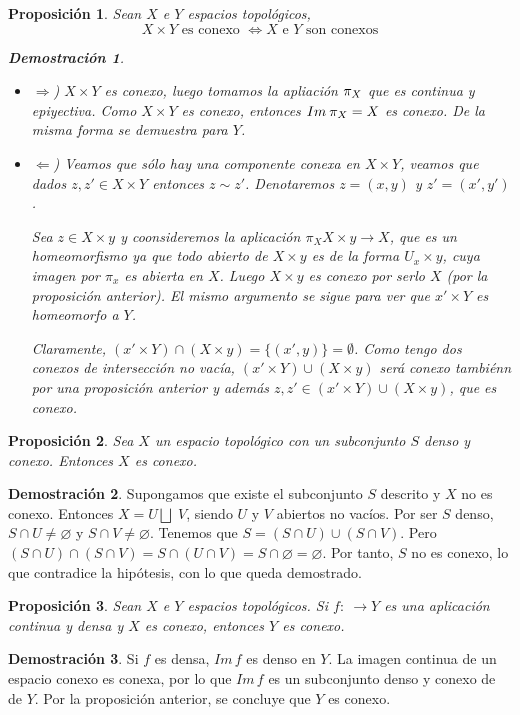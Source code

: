 \documentclass[12pt,twoside]{report}
\theoremstyle{azul}
\theoremstyle{azul2}
\theoremstyle{plain}
\newtheorem*{prop}{Proposición}
\theoremstyle{definition}
\newtheorem*{dem}{Demostración}
\theoremstyle{remark}
\begin{document}
\begin{prop}
Sean $X$ e $Y$ espacios topológicos, 
$$X \times Y \text{ es conexo } \iff X \text{ e } Y \text{ son conexos}$$
\begin{dem}\:\vspace{-5mm}
\begin{itemize}
    \item $\Rightarrow$) $X \times Y$ es conexo, luego tomamos la apliación $\mathlarger{\pi}_X$ que es continua y epiyectiva. Como $X \times Y$ es conexo, entonces $Im \: \mathlarger{\pi_X}=X$ es conexo. De la misma forma se demuestra para $Y$.

\item $\Leftarrow$) Veamos que sólo hay una componente conexa en $X \times Y$, veamos que dados $z,z'\in X \times Y$ entonces $z \sim z'$. Denotaremos $z=(x,y)$ y $z'=(x',y')$. 

Sea $z\in X \times y$ y coonsideremos la aplicación $\pi_X X \times y \longrightarrow X$, que es un homeomorfismo ya que todo abierto de $X\times y$ es de la forma $U_x\times y$, cuya imagen por $\pi_x$ es abierta en $X$. Luego $X \times y$ es conexo por serlo $X$ (por la proposición anterior). El mismo argumento se sigue para ver que $x' \times Y$ es homeomorfo a $Y$.

Claramente, $(x' \times Y) \cap (X \times y)=\{(x',y)\}=\emptyset$. Como tengo dos conexos de intersección no vacía, $(x'\times Y) \cup (X \times y)$ será conexo tambiénn por una proposición anterior y además $z,z' \in (x'\times Y) \cup (X \times y)$, que es conexo.

\end{itemize}
\end{dem}
\end{prop}
\begin{prop}
Sea $X$ un espacio topológico con un subconjunto $S$ denso y conexo. Entonces $X$ es conexo.
\end{prop}
\begin{dem}
Supongamos que existe el subconjunto $S$ descrito y $X$ no es conexo. Entonces $X = U \bigsqcup \; V$, siendo $U$ y $V$ abiertos no vacíos. Por ser $S$ denso, $S \cap U \neq \varnothing$ y $S \cap V \neq \varnothing$. Tenemos que $S = (S \cap U) \cup (S \cap V)$. Pero $(S \cap U) \cap (S \cap V) = S \cap (U \cap V) = S \cap \varnothing = \varnothing$. Por tanto, $S$ no es conexo, lo que contradice la hipótesis, con lo que queda demostrado.
\end{dem}

\begin{prop}
Sean $X$ e $Y$ espacios topológicos. Si $f:\ \longrightarrow Y$ es una aplicación continua y densa y $X$ es conexo, entonces $Y$ es conexo.
\end{prop}
\begin{dem}
Si $f$ es densa, $Im \, f$ es denso en $Y$. La imagen continua de un espacio conexo es conexa, por lo que $Im \, f$ es un subconjunto denso y conexo de de $Y$. Por la proposición anterior, se concluye que $Y$ es conexo.
\end{dem}
\end{document}
